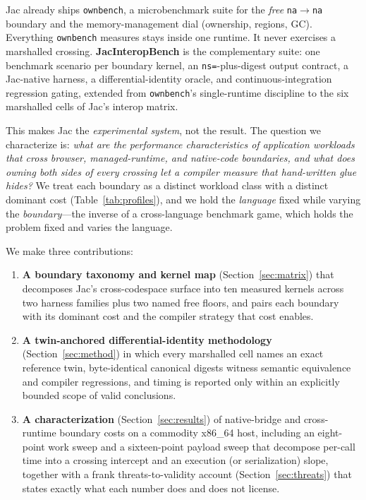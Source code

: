 \documentclass[conference]{IEEEtran}
\newcommand{\code}[1]{\texttt{#1}}
\begin{document}
Jac already ships \code{ownbench}, a microbenchmark suite for the \emph{free}
\code{na$\rightarrow$na} boundary and the memory-management dial (ownership,
regions, GC). Everything \code{ownbench} measures stays inside one runtime. It
never exercises a marshalled crossing. \textbf{JacInteropBench} is the
complementary suite: one benchmark scenario per boundary kernel, an
\code{ns=}-plus-digest output contract, a Jac-native harness, a
differential-identity oracle, and continuous-integration regression gating,
extended from \code{ownbench}'s single-runtime discipline to the six marshalled
cells of Jac's interop matrix.

This makes Jac the \emph{experimental system}, not the result. The question we
characterize is: \emph{what are the performance characteristics of application
workloads that cross browser, managed-runtime, and native-code boundaries, and
what does owning both sides of every crossing let a compiler measure that
hand-written glue hides?} We treat each boundary as a distinct workload class
with a distinct dominant cost (Table~\ref{tab:profiles}), and we hold the
\emph{language} fixed while varying the \emph{boundary}---the inverse of a
cross-language benchmark game, which holds the problem fixed and varies the
language.

We make three contributions:

\begin{enumerate}
  \item \textbf{A boundary taxonomy and kernel map} (Section~\ref{sec:matrix})
  that decomposes Jac's cross-codespace surface into ten measured kernels across
  two harness families plus two named free floors, and pairs each boundary with
  its dominant cost and the compiler strategy that cost enables.
  \item \textbf{A twin-anchored differential-identity methodology}
  (Section~\ref{sec:method}) in which every marshalled cell names an exact
  reference twin, byte-identical canonical digests witness semantic equivalence
  and compiler regressions, and timing is reported only within an explicitly
  bounded scope of valid conclusions.
  \item \textbf{A characterization} (Section~\ref{sec:results}) of native-bridge
  and cross-runtime boundary costs on a commodity x86\_64 host, including an
  eight-point work sweep and a sixteen-point payload sweep that decompose per-call
  time into a crossing intercept and an execution (or serialization) slope,
  together with a frank threats-to-validity account
  (Section~\ref{sec:threats}) that states exactly what each number does and does
  not license.
\end{enumerate}
\end{document}
